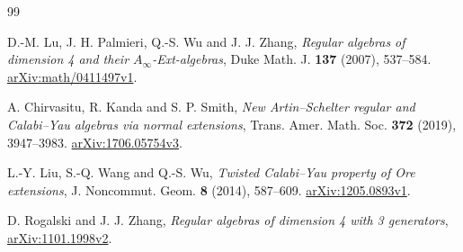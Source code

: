{}
\begin{thebibliography}{99}

D.-M. Lu, J. H. Palmieri, Q.-S. Wu and J. J. Zhang,
\emph{Regular algebras of dimension 4 and their $A_\infty$-Ext-algebras},
Duke Math. J. \textbf{137} (2007), 537--584.
\href{https://arxiv.org/abs/math/0411497v1}{arXiv:math/0411497v1}.

A. Chirvasitu, R. Kanda and S. P. Smith,
\emph{New Artin--Schelter regular and Calabi--Yau algebras via normal extensions},
Trans. Amer. Math. Soc. \textbf{372} (2019), 3947--3983.
\href{https://arxiv.org/abs/1706.05754v3}{arXiv:1706.05754v3}.

L.-Y. Liu, S.-Q. Wang and Q.-S. Wu,
\emph{Twisted Calabi--Yau property of Ore extensions},
J. Noncommut. Geom. \textbf{8} (2014), 587--609.
\href{https://arxiv.org/abs/1205.0893v1}{arXiv:1205.0893v1}.

D. Rogalski and J. J. Zhang,
\emph{Regular algebras of dimension 4 with 3 generators},
\href{https://arxiv.org/abs/1101.1998v2}{arXiv:1101.1998v2}.

\end{thebibliography}
